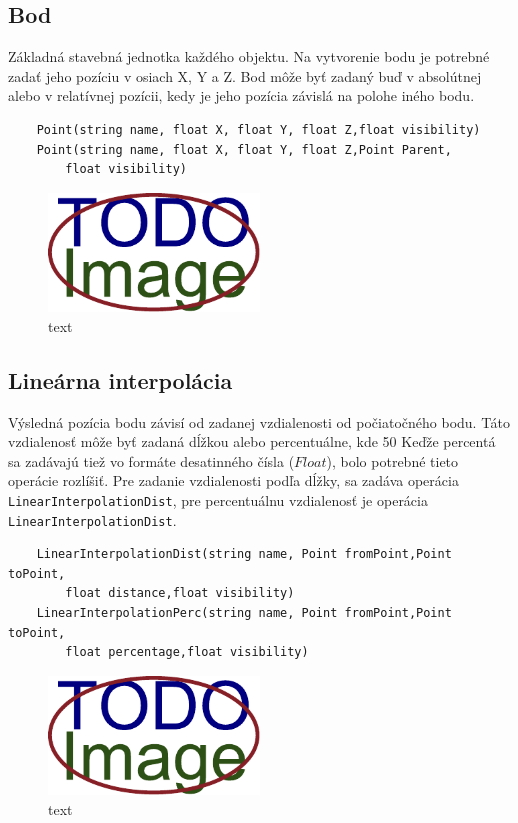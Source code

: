 \subsection{Bod}
Základná stavebná jednotka každého objektu. Na vytvorenie bodu je potrebné zadať jeho pozíciu v osiach X, Y a Z. Bod môže byť zadaný buď v absolútnej alebo v relatívnej pozícii, kedy je jeho pozícia závislá na polohe iného bodu.
\begin{lstlisting}
    Point(string name, float X, float Y, float Z,float visibility) 
    Point(string name, float X, float Y, float Z,Point Parent,
        float visibility)
\end{lstlisting}
\begin{figure}[H]
	\centering
	\includegraphics[width=0.5\textwidth]{obrazky-figures/placeholder.pdf}
	\caption{text}
	\label{fig:1}
\end{figure}

\subsection{Lineárna interpolácia}
Výsledná pozícia bodu závisí od zadanej vzdialenosti od počiatočného bodu. Táto vzdialenosť môže byť zadaná dĺžkou alebo percentuálne, kde 50%
Keďže percentá sa zadávajú tiež vo formáte desatinného čísla ($Float$), bolo potrebné tieto operácie rozlíšiť. Pre zadanie vzdialenosti podľa dĺžky, sa zadáva operácia \texttt{LinearInterpolationDist}, 
pre percentuálnu vzdialenosť je operácia \texttt{LinearInterpolationDist}.
\begin{lstlisting}
    LinearInterpolationDist(string name, Point fromPoint,Point toPoint,
        float distance,float visibility)
    LinearInterpolationPerc(string name, Point fromPoint,Point toPoint,
        float percentage,float visibility)
\end{lstlisting}

\begin{figure}[H]
	\centering
	\includegraphics[width=0.5\textwidth]{obrazky-figures/placeholder.pdf}
	\caption{text}
	\label{fig:1}
\end{figure}

